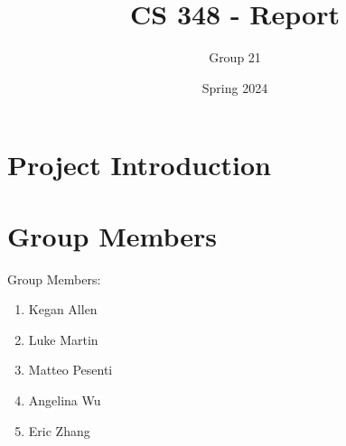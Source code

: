 \documentclass{article}
\title{CS 348 - Report}
\author{Group 21}
\date{Spring 2024}
\begin{document}
\maketitle

\section{Project Introduction}

\section{Group Members}

Group Members:
\begin{enumerate}
    \item Kegan Allen
    \item Luke Martin
    \item Matteo Pesenti
    \item Angelina Wu
    \item Eric Zhang
\end{enumerate}
\end{document}
